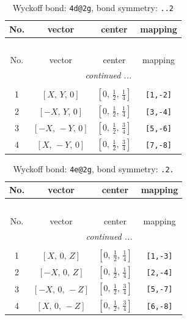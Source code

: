 \documentclass[fleqn,8pt]{jsarticle}
\begin{document}
\begin{longtable}{cccc}
\caption{Wyckoff bond: {\tt 4d@2g}, bond symmetry: {\tt ..2}}
 \\
 \hline \hline
No. & vector & center & mapping \\ \hline \endfirsthead

\multicolumn{3}{l}{\tablename\ \thetable{}} \\
 \hline \hline
No. & vector & center & mapping \\ \hline \endhead

 \hline \hline
\multicolumn{3}{r}{\footnotesize\it continued ...} \\ \endfoot

 \hline \hline
\multicolumn{3}{r}{} \\ \endlastfoot

1 & $\left[ X,\, Y,\, 0 \right]$ & $\left[ 0,\, \frac{1}{2},\, \frac{1}{4} \right]$ & {\tt [1,-2]} \\ \hline
2 & $\left[ - X,\, Y,\, 0 \right]$ & $\left[ 0,\, \frac{1}{2},\, \frac{1}{4} \right]$ & {\tt [3,-4]} \\ \hline
3 & $\left[ - X,\, - Y,\, 0 \right]$ & $\left[ 0,\, \frac{1}{2},\, \frac{3}{4} \right]$ & {\tt [5,-6]} \\ \hline
4 & $\left[ X,\, - Y,\, 0 \right]$ & $\left[ 0,\, \frac{1}{2},\, \frac{3}{4} \right]$ & {\tt [7,-8]} \\
\end{longtable}
\renewcommand{\arraystretch}{1.2}
\begin{longtable}{cccc}
\caption{Wyckoff bond: {\tt 4e@2g}, bond symmetry: {\tt .2.}}
 \\
 \hline \hline
No. & vector & center & mapping \\ \hline \endfirsthead

\multicolumn{3}{l}{\tablename\ \thetable{}} \\
 \hline \hline
No. & vector & center & mapping \\ \hline \endhead

 \hline \hline
\multicolumn{3}{r}{\footnotesize\it continued ...} \\ \endfoot

 \hline \hline
\multicolumn{3}{r}{} \\ \endlastfoot

1 & $\left[ X,\, 0,\, Z \right]$ & $\left[ 0,\, \frac{1}{2},\, \frac{1}{4} \right]$ & {\tt [1,-3]} \\ \hline
2 & $\left[ - X,\, 0,\, Z \right]$ & $\left[ 0,\, \frac{1}{2},\, \frac{1}{4} \right]$ & {\tt [2,-4]} \\ \hline
3 & $\left[ - X,\, 0,\, - Z \right]$ & $\left[ 0,\, \frac{1}{2},\, \frac{3}{4} \right]$ & {\tt [5,-7]} \\ \hline
4 & $\left[ X,\, 0,\, - Z \right]$ & $\left[ 0,\, \frac{1}{2},\, \frac{3}{4} \right]$ & {\tt [6,-8]} \\
\end{longtable}
\end{document}
